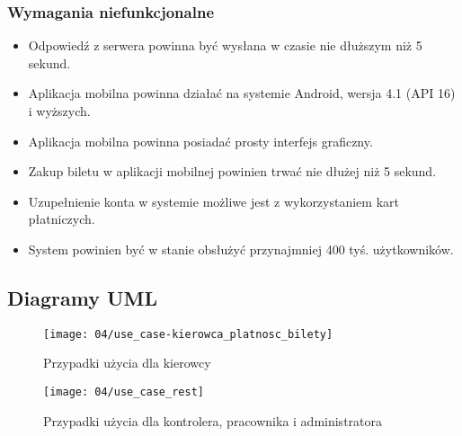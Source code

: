\subsubsection*{Wymagania niefunkcjonalne}

\begin{itemize}
	\item Odpowiedź z serwera powinna być wysłana w czasie nie dłuższym niż 5 sekund.
	\item Aplikacja mobilna powinna działać na systemie Android, wersja 4.1 (API 16) i wyższych.
	\item Aplikacja mobilna powinna posiadać prosty interfejs graficzny.
	\item Zakup biletu w aplikacji mobilnej powinien trwać nie dłużej niż 5 sekund.
	\item Uzupełnienie konta w systemie możliwe jest z wykorzystaniem kart płatniczych.
	\item System powinien być w stanie obsłużyć przynajmniej 400 tyś. użytkowników.
\end{itemize}


\newpage
\subsection{Diagramy UML}


\begin{figure}[h]
	\begin{center}
		\texttt{[image: 04/use\_case-kierowca\_platnosc\_bilety]}
	\end{center}
	\caption{Przypadki użycia dla kierowcy}
\end{figure}

\begin{figure}[p]
	\begin{center}
		\texttt{[image: 04/use\_case\_rest]}
	\end{center}
	\caption{Przypadki użycia dla kontrolera, pracownika i administratora}
\end{figure}

